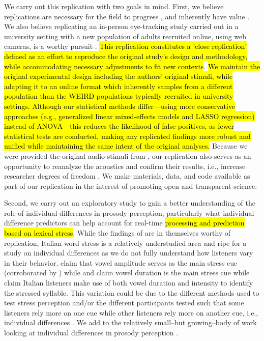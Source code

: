 We carry out this replication with two goals in mind. First, we believe replications are necessary for the field to progress \citep{Rakosi2017}, and inherently have value \citep{Kobrock2023}. We also believe replicating an in-person eye-tracking study carried out in a university setting with a new population of adults recruited online, using web cameras, is a worthy pursuit \citep{Prystauka_Altmann_Rothman_2023}. \hl{This replication constitutes a 'close replication' 
defined as an effort to reproduce the original study's design and methodology, while accommodating necessary adjustments to fit new contexts}\citep{mcmanus2022replication}. \hl{We maintain the original experimental design including the authors' original stimuli, while adapting it to an online format which inherently samples from a different population than the WEIRD populations typically recruited in university settings. Although our statistical methods differ—using more conservative approaches (e.g., generalized linear mixed-effects models and LASSO regression) instead of ANOVA—this reduces the likelihood of false positives, as fewer statistical tests are conducted, making any replicated findings more robust and unified while maintaining the same intent of the original analyses.} Because we were provided the original audio stimuli from \cite{Sulpizio_McQueen_2012}, our replication also serves as an opportunity to reanalyze the acoustics and confirm their results, i.e., increase researcher degrees of freedom \citep{Corretta2023}. We make materials, data, and code available as part of our replication in the interest of promoting open and transparent science.

Second, we carry out an exploratory study to gain a better understanding of the role of individual differences in prosody perception, particularly what individual difference predictors can help account for real-time \hl{processing and prediction based on lexical stress}. While the findings of \cite{Sulpizio_McQueen_2012} are in themselves worthy of replication, Italian word stress is a relatively understudied area and ripe for a study on individual differences as we do not fully understand how listeners vary in their behavior. \cite{Maturi1998} claim that vowel amplitude serves as the main stress cue (corroborated by \cite{Sulpizio_McQueen_2012}) while \cite{Alfano2006} and \cite{Alfano2009} claim vowel duration is the main stress cue while \cite{Tagliapietra2005} claim Italian listeners make use of both vowel duration and intensity to identify the stressed syllable. This variation could be due to the different methods used to test stress perception and/or the different participants tested such that some listeners rely more on one cue while other listeners rely more on another cue, i.e., individual differences \citep{Yu2019, Kidd2018}. We add to the relatively small--but growing--body of work looking at individual differences in prosody perception \citep[e.g.,][]{Roy2017, Bishop2017, Lameris2023, Sinagra2022}.

